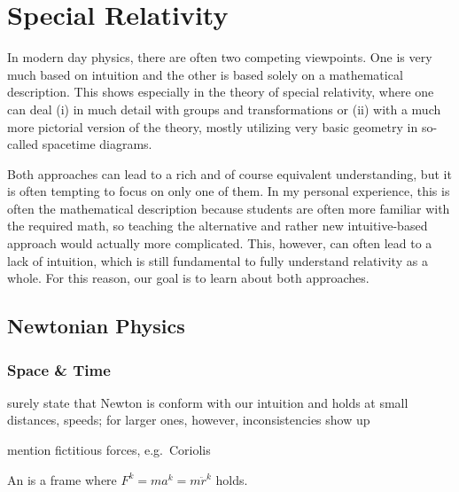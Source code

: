 





\chapter{Special Relativity}

\begin{center}
In modern day physics, there are often two competing viewpoints. One is very much based on intuition and the other is based solely on a mathematical description. This shows especially in the theory of special relativity, where one can deal (i) in much detail with groups and transformations or (ii) with a much more pictorial version of the theory, mostly utilizing very basic geometry in so-called spacetime diagrams.

Both approaches can lead to a rich and of course equivalent understanding, but it is often tempting to focus on only one of them. In my personal experience, this is often the mathematical description because students are often more familiar with the required math, so teaching the alternative and rather new intuitive-based approach would actually more complicated. This, however, can often lead to a lack of intuition, which is still fundamental to fully understand relativity as a whole. For this reason, our goal is to learn about both approaches.
\end{center}





\newpage



	\section{Newtonian Physics}
		\subsection{Space \& Time}

surely state that Newton is conform with our intuition and holds at small distances, speeds; for larger ones, however, inconsistencies show up

mention fictitious forces, e.g.~Coriolis



\begin{defi}
	An  is a frame where $F^k = m a^k = m \ddot{r}^k$ holds.
\end{defi}

